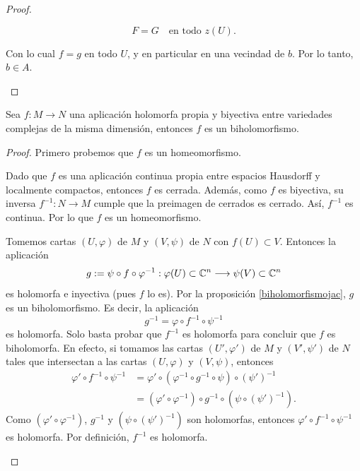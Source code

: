 \begin{proof}
\begin{itemize}
		$$
		F = G \quad \text{en todo } z(U).
		$$
		
		Con lo cual $f=g$ en todo $U$, y en particular en una vecindad de $b$. Por lo tanto, $b\in A$.
	\end{itemize}
\end{proof}


\begin{corollary}
	Sea $f:M\to N$ una aplicación holomorfa propia y biyectiva entre variedades complejas de la misma dimensión, entonces $f$ es un biholomorfismo.
\end{corollary}
\begin{proof}
	Primero probemos que $f$ es un homeomorfismo.
	
	Dado que $f$ es una aplicación continua propia entre espacios Hausdorff y localmente compactos, entonces $f$ es cerrada. Además, como $f$ es biyectiva, su inversa $f^{-1}:N\to M$ cumple que la preimagen de cerrados es cerrado. Así, $f^{-1}$ es continua. Por lo que $f$ es un homeomorfismo. 
	
	Tomemos cartas $(U,\varphi)$ de $M$ y $(V,\psi)$ de $N$ con $f(U)\subset V$. Entonces la aplicación
	\begin{equation*}
		g:=\psi\circ f\circ \varphi^{-1}:\varphi(U)\subset\mathbb{C}^n\longrightarrow \psi(V)\subset\mathbb{C}^n
	\end{equation*}
	es holomorfa e inyectiva (pues $f$ lo es). Por la proposición \ref{biholomorfismojac}, $g$ es un biholomorfismo. Es decir, la aplicación
	\begin{equation*}
		g^{-1}=\varphi\circ f^{-1}\circ \psi^{-1}
	\end{equation*}
	es holomorfa. Solo basta probar que $f^{-1}$ es holomorfa para concluir que $f$ es biholomorfa. En efecto, si tomamos las cartas $(U',\varphi')$ de $M$ y $(V',\psi')$ de $N$ tales que intersectan a las cartas $(U,\varphi)$ y $(V,\psi)$, entonces
	\begin{align*}
		\varphi'\circ f^{-1}\circ \psi^{-1}&=\varphi'\circ (\varphi^{-1}\circ g^{-1}\circ \psi)\circ (\psi')^{-1}\\
		&=(\varphi'\circ \varphi^{-1})\circ g^{-1}\circ (\psi\circ (\psi')^{-1}).
	\end{align*}
	Como $(\varphi'\circ \varphi^{-1})$, $g^{-1}$ y $(\psi\circ (\psi')^{-1})$ son holomorfas, entonces $\varphi'\circ f^{-1}\circ \psi^{-1}$ es holomorfa. Por definición, $f^{-1}$ es holomorfa.
	\begin{center}
	\end{center}
\end{proof}

